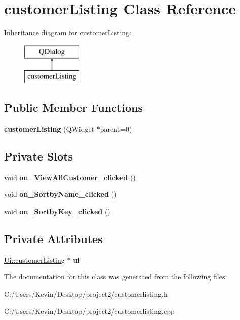 \hypertarget{classcustomer_listing}{}\section{customer\+Listing Class Reference}
\label{classcustomer_listing}
Inheritance diagram for customer\+Listing\+:\begin{figure}[H]
\begin{center}
\leavevmode
\includegraphics[height=2.000000cm]{classcustomer_listing}
\end{center}
\end{figure}
\subsection*{Public Member Functions}
\begin{DoxyCompactItemize}
\item 
\mbox{\label{classcustomer_listing_a0628a9c6898cb9ddd4130ccca331b74a}} 
{\bfseries customer\+Listing} (Q\+Widget $\ast$parent=0)
\end{DoxyCompactItemize}
\subsection*{Private Slots}
\begin{DoxyCompactItemize}
\item 
\mbox{\label{classcustomer_listing_a2dbfc6f3ff2a8bbbab29075a2c105e36}} 
void {\bfseries on\+\_\+\+View\+All\+Customer\+\_\+clicked} ()
\item 
\mbox{\label{classcustomer_listing_a9fb75ab16b507b0842c8067a94636c9a}} 
void {\bfseries on\+\_\+\+Sortby\+Name\+\_\+clicked} ()
\item 
\mbox{\label{classcustomer_listing_a056ef2a290efb5b98fbca8c5a22bbe7c}} 
void {\bfseries on\+\_\+\+Sortby\+Key\+\_\+clicked} ()
\end{DoxyCompactItemize}
\subsection*{Private Attributes}
\begin{DoxyCompactItemize}
\item 
\mbox{\label{classcustomer_listing_a2ebb8ea1a697f3302bb15da9f38b92a9}} 
\mbox{\hyperlink{class_ui_1_1customer_listing}{Ui\+::customer\+Listing}} $\ast$ {\bfseries ui}
\end{DoxyCompactItemize}


The documentation for this class was generated from the following files\+:\begin{DoxyCompactItemize}
\item 
C\+:/\+Users/\+Kevin/\+Desktop/project2/customerlisting.\+h\item 
C\+:/\+Users/\+Kevin/\+Desktop/project2/customerlisting.\+cpp\end{DoxyCompactItemize}
